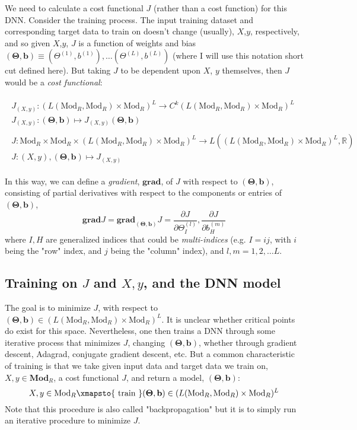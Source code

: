 \documentclass[10pt]{amsart}
\begin{document}
We need to calculate a cost functional $J$ (rather than a cost function) for this DNN.  Consider the training process.  The input training dataset and corresponding target data to train on doesn't change (usually), $X$,$y$, respectively, and so given $X$,$y$, $J$ is a function of weights and bias $\mathbf{(\Theta,b)} \equiv (\Theta^{(1)},b^{(1)}), \dots (\Theta^{(L)},b^{(L)})$ (where I will use this notation short cut defined here).  But taking $J$ to be dependent upon $X$, $y$ themselves, then $J$ would be a \emph{cost functional}:  

\begin{equation}
\begin{gathered}
\begin{gathered}
	J_{(X,y)} : (L(\text{Mod}_R,\text{Mod}_R)\times \text{Mod}_R )^L \to C^{k}(L(\text{Mod}_R, \text{Mod}_R)\times \text{Mod}_R)^L \\
J_{(X,y)}:\mathbf{(\Theta,b)} \mapsto J_{(X,y)}\mathbf{(\Theta,b)}
\end{gathered}   \\
\begin{gathered}
	J:\text{Mod}_R \times \text{Mod}_R \times ( L(\text{Mod}_R,\text{Mod}_R) \times \text{Mod}_R)^L \to L((L(\text{Mod}_R, \text{Mod}_R)\times \text{Mod}_R)^L, \mathbb{R}) \\
J:(X,y), \mathbf{(\Theta,b)} \mapsto J_{(X,y)}
\end{gathered}
\end{gathered}
\end{equation}

In this way, we can define a \emph{gradient}, $\mathbf{\text{grad}}$, of $J$ with respect to $(\mathbf{\Theta,b})$, consisting of partial derivatives with respect to the components or entries of $(\mathbf{\Theta,b})$, 
\[
\mathbf{ \text{grad} } J = \mathbf{ \text{grad}}_{(\mathbf{\Theta,b})} J = \frac{ \partial J }{ \partial \Theta^{(l)}_I}, \frac{ \partial J}{ \partial b^{(m)}_H}
\]  
where $I,H$ are generalized indices that could be \emph{multi-indices} (e.g. $I=ij$, with $i$ being the "row" index, and $j$ being the "column" index), and $l,m=1,2,\dots L$.  

\subsection{Training on $J$ and $X,y$, and the DNN model}\label{SubS:trainDNNmodel}

The goal is to minimize $J$, with respect to $(\mathbf{\Theta,b}) \in (L(\text{Mod}_R, \text{Mod}_R)\times \text{Mod}_R)^L$.  It is unclear whether critical points do exist for this space.  Nevertheless, one then trains a DNN through some iterative process that minimizes $J$, changing $(\mathbf{\Theta,b})$, whether through gradient descent, Adagrad, conjugate gradient descent, etc.  But a common characteristic of training is that we take given input data and target data we train on, $X,y \in \mathbf{ \text{Mod}}_R$, a cost functional $J$, and return a model, $\mathbf{(\Theta,b)}$:
\[
X,y \in \mathbf{ \text{Mod}}_R \xmapsto{ \text{ train } } \mathbf{(\Theta,b)} \in (L(\text{Mod}_R,\text{Mod}_R)\times \text{Mod}_R)^L
\]  
Note that this procedure is also called "backpropagation" but it is to simply run an iterative procedure to minimize $J$.  
\end{document}
